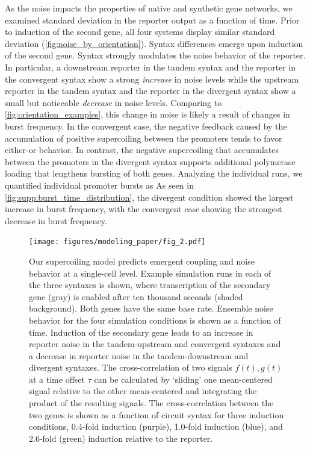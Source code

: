 \documentclass[11pt]{article}
\begin{document}
As the noise impacts the properties of native and synthetic gene networks, we examined standard deviation in the reporter output as a function of time. Prior to induction of the second gene, all four systems display similar standard deviation (\cref{fig:noise_by_orientation}). Syntax differences emerge upon induction of the second gene. Syntax strongly modulates the noise behavior of the reporter. In particular, a downstream reporter in the tandem syntax and the reporter in the convergent syntax show a strong \emph{increase} in noise levels while the upstream reporter in the tandem syntax and the reporter in the divergent syntax show a small but noticeable \emph{decrease} in noise levels. Comparing to \cref{fig:orientation_examples}, this change in noise is likely a result of changes in burst frequency. In the convergent case, the negative feedback caused by the accumulation of positive supercoiling between the promoters tends to favor either-or behavior. In contrast, the negative supercoiling that accumulates between the promoters in the divergent syntax supports additional polymerase loading that lengthens bursting of both genes.
Analyzing the individual runs, we quantified individual promoter bursts as %
As seen in \cref{fig:supp:burst_time_distribution}, the divergent condition showed the largest increase in burst frequency, with the convergent case showing the strongest decrease in burst frequency. %



\begin{figure}[htbp]
    \centering
    {\texttt{[image: figures/modeling\_paper/fig\_2.pdf]}
    \label{fig:orientation_examples}
    \label{fig:noise_by_orientation}
    \label{fig:cross_correlation_cartoon}
    \label{fig:orientation_cross_correlation}}
    \caption{Our supercoiling model predicts emergent coupling and noise behavior at a single-cell level.
         Example simulation runs in each of the three syntaxes is shown, where transcription of the secondary gene (gray) is enabled after ten thousand seconds (shaded background). Both genes have the same base rate.
         Ensemble noise behavior for the four simulation conditions is shown as a function of time. Induction of the secondary gene leads to an increase in reporter noise in the tandem-upstream and convergent syntaxes and a decrease in reporter noise in the tandem-downstream and divergent syntaxes.
         The cross-correlation of two signals \(f(t), g(t)\) at a time offset \(\tau\) can be calculated by `sliding' one mean-centered signal relative to the other mean-centered and integrating the product of the resulting signals.
         The cross-correlation between the two genes is shown as a function of circuit syntax for three induction conditions, 0.4-fold induction (purple), 1.0-fold induction (blue), and 2.6-fold (green) induction relative to the reporter.
    } \label{fig:top:single_cell_noise_correlation}
\end{figure}
\end{document}
